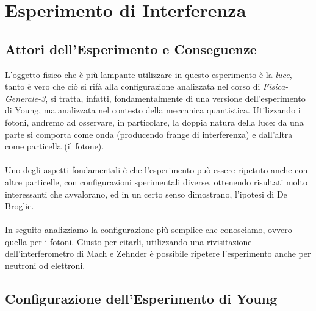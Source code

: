 \newpage

\section{Esperimento di Interferenza}

\subsection{Attori dell'Esperimento e Conseguenze}
	
	L'oggetto fisico che è più lampante utilizzare in questo esperimento è la \textit{luce}, tanto è vero che ciò si rifà alla configurazione analizzata nel corso di \textit{Fisica-Generale-3}, si tratta, infatti, fondamentalmente di una versione dell’esperimento di Young, ma analizzata nel contesto della meccanica quantistica. Utilizzando i fotoni, andremo ad osservare, in particolare, la doppia natura della luce: da una parte si comporta come onda (producendo frange di interferenza) e dall’altra come particella (il fotone).
	\\
	\\
	Uno degli aspetti fondamentali è che l'esperimento può essere ripetuto anche con altre particelle, con configurazioni sperimentali diverse, ottenendo risultati molto interessanti che avvalorano, ed in un certo senso dimostrano, l'ipotesi di De Broglie.
	\\
	\\
	In seguito analizziamo la configurazione più semplice che conosciamo, ovvero quella per i fotoni. Giusto per citarli, utilizzando una rivisitazione dell'interferometro di Mach e Zehnder è possibile ripetere l'esperimento anche per neutroni od elettroni.
	
\subsection{Configurazione dell'Esperimento di Young}
	

